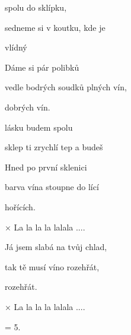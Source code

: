 

\zs
{} spolu do sklípku,

sedneme si v koutku, kde je 

vlídný 
\ks

\zs
Dáme si pár polibků

vedle bodrých soudků plných vín,

dobrých vín.
\ks

\zr
{} lásku budem spolu  

 sklep ti zrychlí tep a  budeš 
\kr

\zs
Hned po první sklenici

barva vína stoupne do lící

hořících.
\ks

× La la la la lalala ....
\ks

\zr
\kr

\zs
Já jsem slabá na tvůj chlad,

tak tě musí víno rozehřát,

rozehřát.
\ks

× La la la la lalala ....
\ks

\zr
\kr

\zs
= 5.
\ks

\kp
